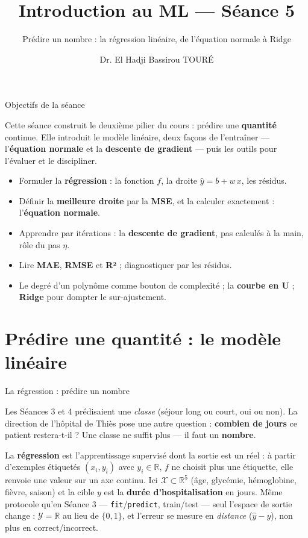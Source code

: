 \documentclass[aspectratio=169,11pt]{beamer}
\title{Introduction au ML — Séance 5}
\subtitle{Prédire un nombre : la régression linéaire, de l'équation normale à Ridge}
\author{Dr. El Hadji Bassirou TOURÉ}
\institute{Département de Mathématiques et Informatique\\ Faculté des Sciences et Techniques\\ Université Cheikh Anta Diop de Dakar}
\date{}
\begin{document}
\begin{frame}\titlepage\end{frame}

\begin{frame}{Objectifs de la séance}
\begin{ucaddef}[Contenu]
{\small Cette séance construit le deuxième pilier du cours : prédire une \textbf{quantité} continue. Elle introduit le modèle linéaire, deux façons de l'entraîner — l'\textbf{équation normale} et la \textbf{descente de gradient} — puis les outils pour l'évaluer et le discipliner.}
\end{ucaddef}
\begin{itemize}\small
  \item Formuler la \textbf{régression} : la fonction $f$, la droite $\hat y = b + w\,x$, les résidus.
  \item Définir la \textbf{meilleure droite} par la \textbf{MSE}, et la calculer exactement : l'\textbf{équation normale}.
  \item Apprendre par itérations : la \textbf{descente de gradient}, pas calculés à la main, rôle du pas $\eta$.
  \item Lire \textbf{MAE}, \textbf{RMSE} et \textbf{R²} ; diagnostiquer par les résidus.
  \item Le degré d'un polynôme comme bouton de complexité ; la \textbf{courbe en U} ; \textbf{Ridge} pour dompter le sur-ajustement.
\end{itemize}
\end{frame}

\section[Prédire : le modèle linéaire]{Prédire une quantité : le modèle linéaire}

\begin{frame}{La régression : prédire un nombre}
\begin{ucadfront}
{\small Les Séances 3 et 4 prédisaient une \emph{classe} (séjour long ou court, oui ou non). La direction de l'hôpital de Thiès pose une autre question : \textbf{combien de jours} ce patient restera-t-il ? Une classe ne suffit plus — il faut un \textbf{nombre}.}
\end{ucadfront}
{\small La \textbf{régression} est l'apprentissage supervisé dont la sortie est un réel : à partir d'exemples étiquetés $(x_i, y_i)$ avec $y_i \in \mathbb{R}$, $f$ ne choisit plus une étiquette, elle renvoie une valeur sur un axe continu. Ici $\mathcal{X} \subset \mathbb{R}^{5}$ (âge, glycémie, hémoglobine, fièvre, saison) et la cible $y$ est la \textbf{durée d'hospitalisation} en jours. Même protocole qu'en Séance 3 — \texttt{fit}/\texttt{predict}, train/test — seul l'espace de sortie change : $\mathcal{Y} = \mathbb{R}$ au lieu de $\{0,1\}$, et l'erreur se mesure en \emph{distance} ($\hat y - y$), non plus en correct/incorrect.}
\end{frame}
\end{document}
